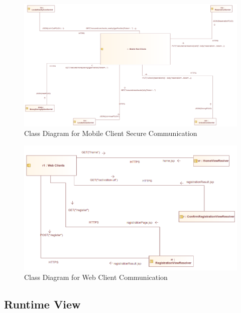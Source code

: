 \documentclass[12pt]{article}
\begin{document}
\begin{figure}[h]
	\centering
	\includegraphics[width=\textwidth]{../Images/MobileClient_SecuredCommunication}
	\caption{Class Diagram for Mobile Client Secure Communication}
\end{figure}

\begin{figure}[h]
	\centering
	\includegraphics[width=\textwidth]{../Images/WebClient_Communication}
	\caption{Class Diagram for Web Client Communication}
\end{figure}
\clearpage

\subsection{Runtime View}
\end{document}
